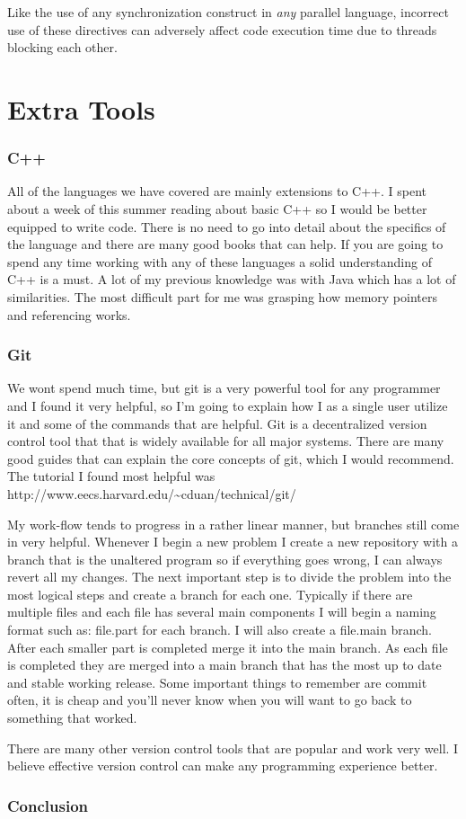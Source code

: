 \documentclass{article}
\newcommand{\comp}[1]{{\ttfamily #1}}
\begin{document}
    Like the use of any synchronization construct in \emph{any} parallel language, incorrect use of these directives can adversely affect code execution time due to threads blocking each other.   

\part{Extra Tools}
  \section{C++}
  All of the languages we have covered are mainly extensions to C++. I spent about a week of this summer reading about basic C++ so I would be better equipped to write code. There is no need to go into detail about the specifics of the language and there are many good books that can help. If you are going to spend any time working with any of these languages a solid understanding of C++ is a must. A lot of my previous knowledge was with Java which has a lot of similarities. The most difficult part for me was grasping how memory pointers and referencing works.

  \section{Git}
  We wont spend much time, but git is a very powerful tool for any programmer and I found it very helpful, so I'm going to explain how I as a single user utilize it and some of the commands that are helpful. Git is a decentralized version control tool that that is widely available for all major systems. There are many good guides that can explain the core concepts of git, which I would recommend. The tutorial I found most helpful was \comp{http://www.eecs.harvard.edu/\~{}cduan/technical/git/}

My work-flow tends to progress in a rather linear manner, but branches still come in very helpful. Whenever I begin a new problem I create a new repository with a branch that is the unaltered program so if everything goes wrong, I can always revert all my changes. The next important step is to divide the problem into the most logical steps and create a branch for each one. Typically if there are multiple files and each file has several main components I will begin a naming format such as: \comp{file.part} for each branch. I will also create a \comp{file.main} branch. After each smaller part is completed merge it into the \comp{main} branch. As each file is completed they are merged into a \comp{main} branch that has the most up to date and stable working release. Some important things to remember are commit often, it is cheap and you'll never know when you will want to go back to something that worked.

There are many other version control tools that are popular and work very well. I believe effective version control can make any programming experience better.

\section{Conclusion}


\nocite{*}



\end{document}
